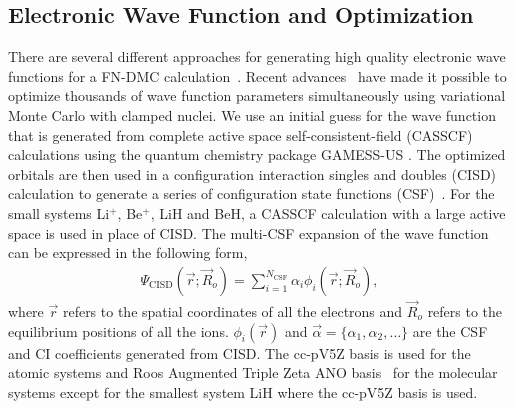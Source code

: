 \documentclass[pra,superscriptaddress,groupedaddress,twocolumn]{revtex4-1}
\begin{document}
\subsection{Electronic Wave Function and Optimization}

There are several different approaches for generating high quality electronic wave functions for a FN-DMC calculation~\cite{Umrigar_Alleviation,Toulouse_Bench,Brown_Bench,Seth_Bench}. Recent advances~\cite{Nightingale_Linear,Umrigar_Linear,Brown_Bench} have made it possible to optimize thousands of wave function parameters simultaneously using variational Monte Carlo with clamped nuclei. We use an initial guess for the wave function that is generated from complete active space self-consistent-field (CASSCF) \cite{Chaban_MCSCF,Szabo} calculations using the quantum chemistry package GAMESS-US \cite{GAMESS}. The optimized orbitals are then used in a configuration interaction singles and doubles (CISD) calculation to generate a series of configuration state functions (CSF)~\cite{Pauncz_CSF}. For the small systems Li$^+$, Be$^+$, LiH and BeH, a CASSCF calculation with a large active space is used in place of CISD. The multi-CSF expansion of the wave function can be expressed in the following form,
\begin{align}
\Psi_{\text{CISD}}(\vec{r};\vec{R}_o)=\sum\limits_{i=1}^{N_{\text{CSF}}}\alpha_i\phi_i(\vec{r};\vec{R}_o), \label{eq:psi_gms}
\end{align}
where $\vec{r}$ refers to the spatial coordinates of all the electrons and $\vec{R}_o$ refers to the equilibrium positions of all the ions. $\phi_i(\vec{r})$ and $\vec{\alpha}=\{\alpha_1,\alpha_2,\dots\}$ are the CSF and CI coefficients generated from CISD. The cc-pV5Z basis \cite{dunning} is used for the atomic systems and Roos Augmented Triple Zeta ANO basis~\cite{roos} for the molecular systems except for the smallest system LiH where the cc-pV5Z basis is used.
\end{document}
